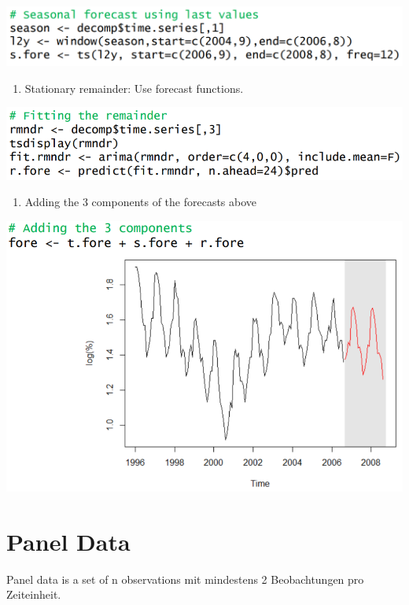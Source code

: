 \documentclass[
]{article}
\providecommand{\tightlist}{%
  \setlength{\itemsep}{0pt}\setlength{\parskip}{0pt}}
\begin{document}
\includegraphics[width=1\linewidth]{seas}

\begin{enumerate}
\def\labelenumi{\arabic{enumi}.}
\setcounter{enumi}{2}
\tightlist
\item
  Stationary remainder: Use forecast functions.
\end{enumerate}

\includegraphics[width=1\linewidth]{resid}

\begin{enumerate}
\def\labelenumi{\arabic{enumi}.}
\setcounter{enumi}{3}
\tightlist
\item
  Adding the 3 components of the forecasts above
\end{enumerate}

\includegraphics[width=1\linewidth]{add}

\hypertarget{panel-data}{%
\section{Panel Data}\label{panel-data}}

Panel data is a set of n observations mit mindestens 2 Beobachtungen pro
Zeiteinheit.
\end{document}

